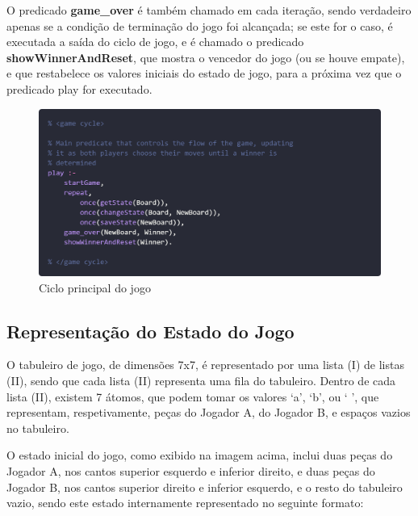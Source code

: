 \documentclass[a4paper]{article}
\begin{document}
\bigskip
O predicado \textbf{game\_over} é também chamado em cada iteração, sendo verdadeiro apenas se a condição de terminação do jogo foi alcançada; se este for o caso, é executada a saída do ciclo de jogo, e é chamado o predicado \textbf{showWinnerAndReset}, que mostra o vencedor do jogo (ou se houve empate), e que restabelece os valores iniciais do estado de jogo, para a próxima vez que o predicado play for executado.
\bigskip

\begin{figure}[hbp!]
    \centering
    \includegraphics[width=\linewidth]{prints/play-cycle.png}
    \caption{Ciclo principal do jogo}
    \label{fig}
\end{figure}

\newpage\subsection{Representação do Estado do Jogo} 

\bigskip
O tabuleiro de jogo, de dimensões 7x7, é representado por uma lista (I) de listas (II), sendo que cada lista (II) representa uma fila do tabuleiro. Dentro de cada lista (II), existem 7 átomos, que podem tomar os valores ‘a’, ‘b’, ou ‘ ’, que representam, respetivamente, peças do Jogador A, do Jogador B, e espaços vazios no tabuleiro.

\bigskip
O estado inicial do jogo, como exibido na imagem acima, inclui duas peças do Jogador A, nos cantos superior esquerdo e inferior direito, e duas peças do Jogador B, nos cantos superior direito e inferior esquerdo, e o resto do tabuleiro vazio, sendo este estado internamente representado no seguinte formato:
\end{document}
